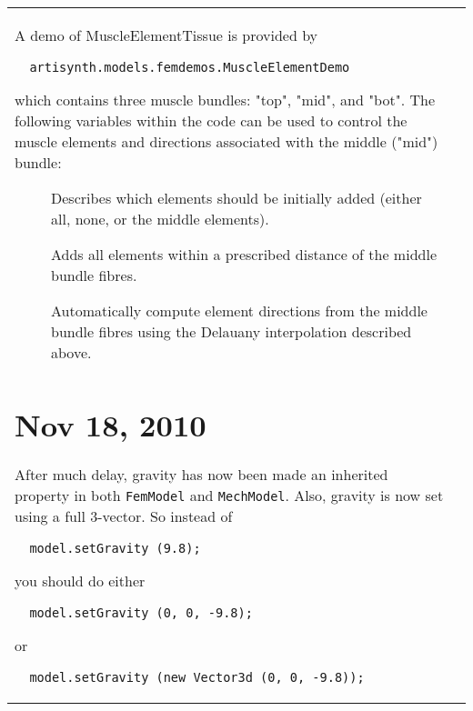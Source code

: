 \documentclass{article}
\begin{document}
\begin{tabular}{ll}
\begin{description}
\end{description}

A demo of MuscleElementTissue is provided by

\begin{verbatim}
  artisynth.models.femdemos.MuscleElementDemo
\end{verbatim}

which contains three muscle bundles: "top", "mid", and "bot". The
following variables within the code can be used to control the muscle
elements and directions associated with the middle ("mid") bundle:

\begin{description}

\item[{\tt defaultMidElements}]  \mbox{}

Describes which elements should be initially added (either
all, none, or the middle elements).

\item[{\tt addMidElementsWithin}] \mbox{}

Adds all elements within a prescribed distance of the middle bundle
fibres.

\item[{\tt autoComputeMidDirections}] \mbox{}

Automatically compute element directions from the middle bundle fibres
using the Delauany interpolation described above.

\end{description}

\section*{Nov 18, 2010}

After much delay, gravity has now been made an inherited property in
both {\tt FemModel} and {\tt MechModel}. Also, gravity is now set using a full
3-vector. So instead of 

\begin{verbatim}
  model.setGravity (9.8);
\end{verbatim}

you should do either

\begin{verbatim}
  model.setGravity (0, 0, -9.8);
\end{verbatim}

or

\begin{verbatim}
  model.setGravity (new Vector3d (0, 0, -9.8));
\end{verbatim}


\end{tabular}
\end{document}
